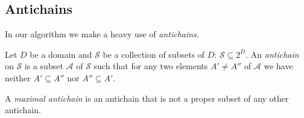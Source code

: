 %

%

\subsection{Antichains}\label{sec:antichains}
In our algorithm we make a heavy use of \emph{antichains}.

\begin{definition}\label{def:antichain}
	Let $D$ be a domain and $\mathcal{S}$ be a collection of subsets of $D$:
	$\mathcal{S}\subseteq 2^D$. An \emph{antichain} on $\mathcal{S}$ is a subset
	$\mathcal{A}$ of $\mathcal{S}$ such that for any two elements $A' \neq A''$ of
	$\mathcal{A}$ we have neither $A'\subseteq A''$ nor $A''\subseteq A'$.

	A \emph{maximal antichain} is an antichain that is not a proper subset of
	any other antichain.
\end{definition}

